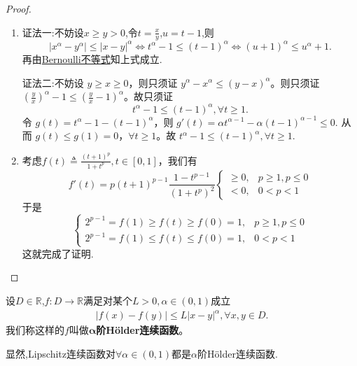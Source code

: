 \documentclass[../../main.tex]{subfiles}%
\begin{document}
\begin{proof}
\begin{enumerate}[(1)]
\item {\color{blue}证法一:}不妨设$x\geqslant y>0$,令$t=\frac{x}{y}$,$u=t-1$,则
\[
\left| x^{\alpha}-y^{\alpha} \right|\leqslant \left| x-y \right|^{\alpha}\Longleftrightarrow t^{\alpha}-1\leqslant \left( t-1 \right)^{\alpha}\Longleftrightarrow \left( u+1 \right)^{\alpha}\leqslant u^{\alpha}+1.
\]
再由\hyperref[theorem:Bernoulli不等式]{Bernoulli不等式}知上式成立.

{\color{blue}证法二:}不妨设 $y \geqslant x \geqslant 0$，则只须证 $y^{\alpha} - x^{\alpha} \leqslant \left( y - x \right)^{\alpha}$。则只须证 $\left( \frac{y}{x} \right)^{\alpha} - 1 \leqslant \left( \frac{y}{x} - 1 \right)^{\alpha}$。故只须证
\[
t^{\alpha} - 1 \leqslant \left( t - 1 \right)^{\alpha}, \forall t \geqslant 1.
\]
令 $g\left( t \right) = t^{\alpha} - 1 - \left( t - 1 \right)^{\alpha}$，则
\(
g'\left( t \right) = \alpha t^{\alpha - 1} - \alpha \left( t - 1 \right)^{\alpha - 1} \leqslant 0.
\)
从而 $g\left( t \right) \leqslant g\left( 1 \right) = 0$，$\forall t \geqslant 1$。故
\(
t^{\alpha} - 1 \leqslant \left( t - 1 \right)^{\alpha},\forall t \geqslant 1.
\)

\item 考虑\(f(t)\triangleq\frac{(t + 1)^p}{1 + t^p},t\in[0,1]\)，我们有
\[
f'(t)=p(t + 1)^{p - 1}\frac{1 - t^{p - 1}}{(1 + t^p)^2}
\begin{cases}
\geqslant0,& p\geqslant1,p\leqslant0\\
<0,& 0 < p < 1
\end{cases}
\]
于是
\[
\begin{cases}
2^{p - 1}=f(1)\geqslant f(t)\geqslant f(0)=1,& p\geqslant1,p\leqslant0\\
2^{p - 1}=f(1)\leqslant f(t)\leqslant f(0)=1,& 0 < p < 1
\end{cases}
\]
这就完成了证明.
\end{enumerate}
\end{proof}

\begin{definition}[Hölder连续]
设$D\in \mathbb{R}$,$f\colon D\to \mathbb{R}$满足对某个$L>0,\alpha\in(0,1)$成立
\begin{align*}
|f(x)-f(y)|\leqslant L|x-y|^\alpha,\forall x,y\in D.
\end{align*}
我们称这样的$f$叫做$\boldsymbol{\alpha}$\textbf{阶Hölder连续函数}。
\end{definition}
\begin{remark}
显然,Lipschitz连续函数对$\forall \alpha \in (0,1)$都是$\alpha$阶Hölder连续函数.
\end{remark}
\end{document}
